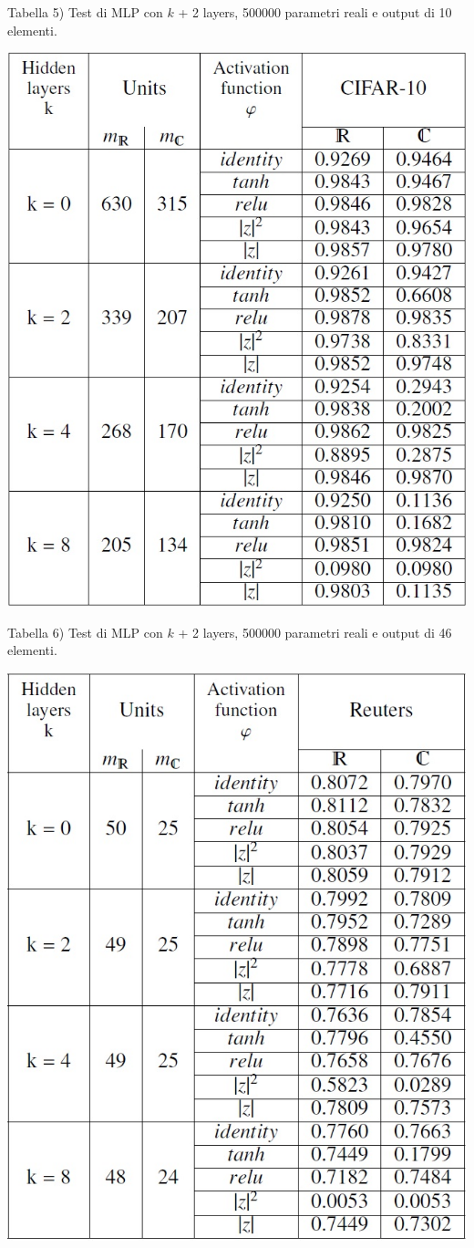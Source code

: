 \documentclass[a4paper,10pt]{article}
\begin{document}
Tabella 5) Test di MLP con $k$ + 2 layers, 500000 parametri reali e output di 10 elementi.

\includegraphics[width=%
\textwidth]{tabella5}


Tabella 6) Test di MLP con $k$ + 2 layers, 500000 parametri reali e output di 46 elementi.

\includegraphics[width=%
\textwidth]{tabella6}
\end{document}
